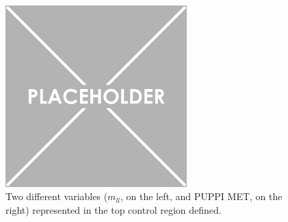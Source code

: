 \documentclass[a4paper, 10pt, openright]{report}
\begin{document}
\begin{figure}[htbp]
{\begin{minipage}[b]{.48\textwidth}
\end{minipage}\hfill
\begin{minipage}[b]{.48\textwidth}
\includegraphics[width=7cm, height=7cm]{figs/placeholder.png}
\end{minipage} \hfill
}
\caption{Two different variables ($m_{ll}$, on the left, and \ac{PUPPI} \ac{MET}, on the right) represented in the top control region defined.}
\label{fig:TopCR}
\end{figure}
\end{document}
